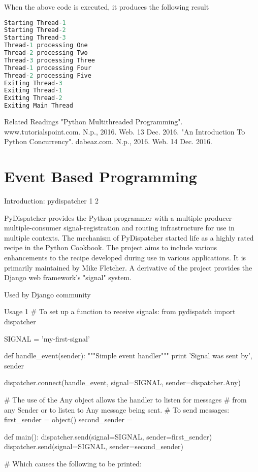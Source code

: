 When the above code is executed, it produces the following result

\begin{lstlisting}[language=Python]
Starting Thread-1
Starting Thread-2
Starting Thread-3
Thread-1 processing One
Thread-2 processing Two
Thread-3 processing Three
Thread-1 processing Four
Thread-2 processing Five
Exiting Thread-3
Exiting Thread-1
Exiting Thread-2
Exiting Main Thread
\end{lstlisting}

Related Readings
"Python Multithreaded Programming". www.tutorialspoint.com. N.p., 2016. Web. 13 Dec. 2016.
"An Introduction To Python Concurrency". dabeaz.com. N.p., 2016. Web. 14 Dec. 2016.

\section{Event Based Programming}

Introduction: pydispatcher 1 2

PyDispatcher provides the Python programmer with a multiple-producer-multiple-consumer signal-registration and routing infrastructure for use in multiple contexts. The mechanism of PyDispatcher started life as a highly rated recipe in the Python Cookbook. The project aims to include various enhancements to the recipe developed during use in various applications. It is primarily maintained by Mike Fletcher. A derivative of the project provides the Django web framework's "signal" system.

Used by Django community

Usage 1
# To set up a function to receive signals:
from pydispatch import dispatcher

SIGNAL = 'my-first-signal'


def handle_event(sender):
    """Simple event handler"""
    print 'Signal was sent by', sender


dispatcher.connect(handle_event, signal=SIGNAL, sender=dispatcher.Any)

# The use of the Any object allows the handler to listen for messages
# from any Sender or to listen to Any message being sent.
# To send messages:
first_sender = object()
second_sender = {}


def main():
    dispatcher.send(signal=SIGNAL, sender=first_sender)
    dispatcher.send(signal=SIGNAL, sender=second_sender)

    # Which causes the following to be printed:

